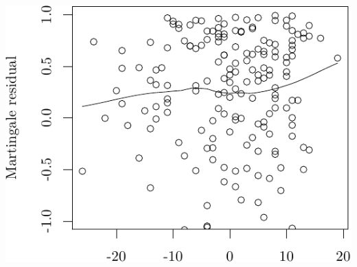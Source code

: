 \documentclass{article}\usepackage[]{graphicx}\usepackage[]{color}
\makeatletter
\def\maxwidth{ %
  \ifdim\Gin@nat@width>\linewidth
    \linewidth
  \else
    \Gin@nat@width
  \fi
}
\newenvironment{knitrout}{}{} %
\makeatother
\begin{document}
\begin{knitrout}
{\centering \includegraphics[width=\maxwidth]{figure/05-eda-func-form-age-2} 

}



\end{knitrout}
\end{document}
